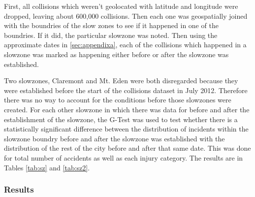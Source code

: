 \documentclass[10pt,journal,compsoc]{IEEEtran}
\begin{document}
First, all collisions which weren't geolocated with latitude and longitude were dropped, leaving about 600,000 collisions.  Then each one was geospatially joined with the boundries of the slow zones to see if it happened in one of the boundries.  If it did, the particular slowzone was noted.  Then using the approximate dates in \ref{sec:appendixa}, each of the collisions which happened in a slowzone was marked as happening either before or after the slowzone was established.

Two slowzones, Claremont and Mt. Eden were both disregarded because they were established before the start of the collisions dataset in July 2012.  Therefore there was no way to account for the conditions before those slowzones were created.  For each other slowzone in which there was data for before and after the establishment of the slowzone, the G-Test was used to test whether there is a statistically significant difference between the distribution of incidents within the slowzone boundry before and after the slowzone was established with the distribution of the rest of the city before and after that same date.  This was done for total number of accidents as well as each injury category.  The results are in Tables \ref{tab:sz} and \ref{tab:sz2}.

\subsubsection{Results}
\end{document}
